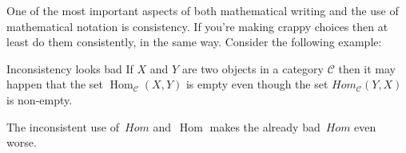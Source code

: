 One of the most important aspects of both mathematical writing and the use of mathematical notation is consistency.
If you’re making crappy choices then at least do them consistently, in the same way.
Consider the following example:
% 
% 
\begin{showlatex}{Inconsistency looks bad}
If $X$ and $Y$ are two objects in a category $\mathcal{C}$ then it may happen that the set $\operatorname{Hom}_{\mathcal{C}}(X,Y)$ is empty even though the set $Hom_{\mathcal{C}}(Y,X)$ is non-empty.
\end{showlatex}
The inconsistent use of~$Hom$ and~$\operatorname{Hom}$ makes the already bad~$Hom$ even worse.




